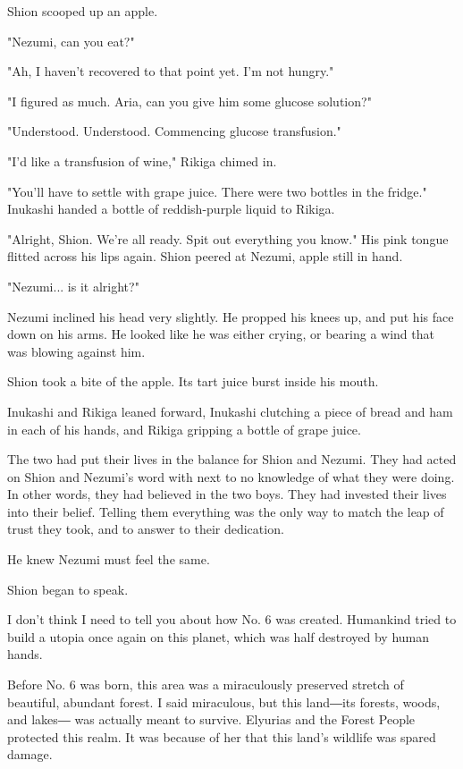 Shion scooped up an apple.

"Nezumi, can you eat?"

"Ah, I haven't recovered to that point yet. I'm not hungry."

"I figured as much. Aria, can you give him some glucose solution?"

"Understood. Understood. Commencing glucose transfusion."

"I'd like a transfusion of wine," Rikiga chimed in.

"You'll have to settle with grape juice. There were two bottles in the
fridge." Inukashi handed a bottle of reddish-purple liquid to Rikiga.

"Alright, Shion. We're all ready. Spit out everything you know." His
pink tongue flitted across his lips again. Shion peered at Nezumi, apple
still in hand.

"Nezumi... is it alright?"

Nezumi inclined his head very slightly. He propped his knees up, and put
his face down on his arms. He looked like he was either crying, or
bearing a wind that was blowing against him.

Shion took a bite of the apple. Its tart juice burst inside his mouth.

Inukashi and Rikiga leaned forward, Inukashi clutching a piece of bread
and ham in each of his hands, and Rikiga gripping a bottle of grape
juice.

The two had put their lives in the balance for Shion and Nezumi. They
had acted on Shion and Nezumi's word with next to no knowledge of what
they were doing. In other words, they had believed in the two boys. They
had invested their lives into their belief. Telling them everything was
the only way to match the leap of trust they took, and to answer to
their dedication.

He knew Nezumi must feel the same.

Shion began to speak.

I don't think I need to tell you about how No. 6 was created. Humankind
tried to build a utopia once again on this planet, which was half
destroyed by human hands.

Before No. 6 was born, this area was a miraculously preserved stretch of
beautiful, abundant forest. I said miraculous, but this land―its
forests, woods, and lakes― was actually meant to survive. Elyurias and
the Forest People protected this realm. It was because of her that this
land's wildlife was spared damage.


